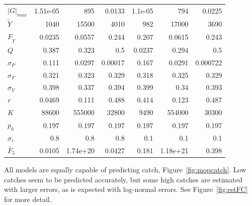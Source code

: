 \documentclass[12pt,letterpaper]{article}
\newcommand\MSY{\widetilde{Y}}
\newcommand\Fmsy{F_{\MSY}}
\begin{document}
\begin{table}
{\begin{center}
\begin{tabular}{|l|rrr|rrr|}
$|G|_{max}$ & 1.51e-05 & 895 & 0.0133 & 1.1e-05 & 794 & 0.0225\\
$\MSY$ & 1040 & 15500 & 4010 & 982 & 17000 & 3690\\
$\Fmsy$ & 0.0235 & 0.0557 & 0.244 & 0.207 & 0.0615 & 0.243\\
$Q$ & 0.387 & 0.323 & 0.5 & 0.0237 & 0.294 & 0.5\\
$\sigma_P$ & 0.111 & 0.0297 & 0.00017 & 0.167 & 0.0291 & 0.000722\\
$\sigma_F$ & 0.321 & 0.323 & 0.329 & 0.318 & 0.325 & 0.329\\
$\sigma_Y$ & 0.398 & 0.337 & 0.394 & 0.399 & 0.34 & 0.393\\
$r$ & 0.0469 & 0.111 & 0.488 & 0.414 & 0.123 & 0.487\\
$K$ & 88600 & 555000 & 32800 & 9490 & 554000 & 30300\\
$p_0$ & 0.197 & 0.197 & 0.197 & 0.197 & 0.197 & 0.197\\
$\sigma_r$ & 0.8 & 0.8 & 0.8 & 0.1 & 0.1 & 0.1\\
$\bar{F}_5$ & 0.0105 & 1.74e+20 & 0.0427 & 0.181 & 1.18e+21 & 0.398\\
\hline
\end{tabular}
\end{center}
}
\end{table}


All models are equally capable of predicting catch,
Figure~\ref{fig:mopcatch}. Low catches seem to be predicted
accurately, but some high catches are estimated with larger errors, as is
expected with log-normal errors. 
See Figure~\ref{fig:estFC} for more detail.
\end{document}
